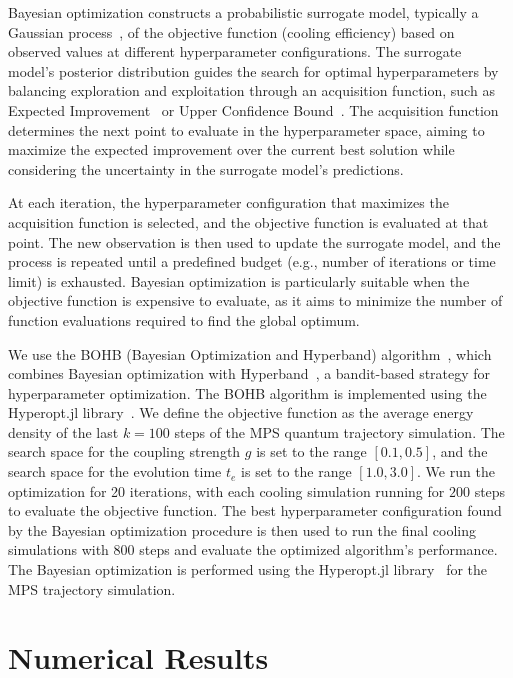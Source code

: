 \documentclass[aps,pra,twocolumn,superscriptaddress,nolongbibliography,nobalancelastpage,10pt]{revtex4-2}
\begin{document}
Bayesian optimization constructs a probabilistic surrogate model, typically a Gaussian process~\cite{Rasmussen2006Gaussian}, of the objective function (cooling efficiency) based on observed values at different hyperparameter configurations. The surrogate model's posterior distribution guides the search for optimal hyperparameters by balancing exploration and exploitation through an acquisition function, such as Expected Improvement~\cite{Mockus1978Application} or Upper Confidence Bound~\cite{Srinivas2010Gaussian}. The acquisition function determines the next point to evaluate in the hyperparameter space, aiming to maximize the expected improvement over the current best solution while considering the uncertainty in the surrogate model's predictions.

At each iteration, the hyperparameter configuration that maximizes the acquisition function is selected, and the objective function is evaluated at that point. The new observation is then used to update the surrogate model, and the process is repeated until a predefined budget (e.g., number of iterations or time limit) is exhausted. Bayesian optimization is particularly suitable when the objective function is expensive to evaluate, as it aims to minimize the number of function evaluations required to find the global optimum.

We use the BOHB (Bayesian Optimization and Hyperband) algorithm~\cite{Falkner2018BOHB}, which combines Bayesian optimization with Hyperband~\cite{Li2017Hyperband}, a bandit-based strategy for hyperparameter optimization. The BOHB algorithm is implemented using the Hyperopt.jl library~\cite{Hyperopt.jl}. We define the objective function as the average energy density of the last $k=100$ steps of the MPS quantum trajectory simulation. The search space for the coupling strength $g$ is set to the range $[0.1, 0.5]$, and the search space for the evolution time $t_e$ is set to the range $[1.0, 3.0]$. We run the optimization for 20 iterations, with each cooling simulation running for $200$ steps to evaluate the objective function. The best hyperparameter configuration found by the Bayesian optimization procedure is then used to run the final cooling simulations with $800$ steps and evaluate the optimized algorithm's performance. The Bayesian optimization is performed using the Hyperopt.jl library~\cite{Hyperopt.jl} for the MPS trajectory simulation.

\section{Numerical Results}
\end{document}
